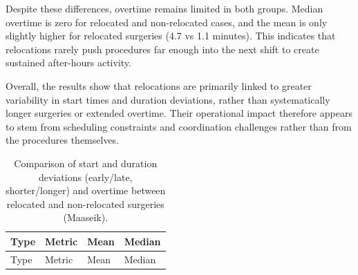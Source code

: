 \documentclass[
]{article}
\begin{document}
Despite these differences, overtime remains limited in both groups.
Median overtime is zero for relocated and non-relocated cases, and the
mean is only slightly higher for relocated surgeries (4.7 vs 1.1
minutes). This indicates that relocations rarely push procedures far
enough into the next shift to create sustained after-hours activity.

Overall, the results show that relocations are primarily linked to
greater variability in start times and duration deviations, rather than
systematically longer surgeries or extended overtime. Their operational
impact therefore appears to stem from scheduling constraints and
coordination challenges rather than from the procedures themselves.

\begin{longtable}[]{@{}
  >{\centering\arraybackslash}p{}
  >{\centering\arraybackslash}p{}
  >{\centering\arraybackslash}p{}
  >{\centering\arraybackslash}p{}@{}}
\caption{Comparison of start and duration deviations (early/late,
shorter/longer) and overtime between relocated and non-relocated
surgeries (Maaseik). \label{tab:room_swap_impact}}\tabularnewline
\toprule\noalign{}
\begin{minipage}[b]{\linewidth}\centering
Type
\end{minipage} & \begin{minipage}[b]{\linewidth}\centering
Metric
\end{minipage} & \begin{minipage}[b]{\linewidth}\centering
Mean
\end{minipage} & \begin{minipage}[b]{\linewidth}\centering
Median
\end{minipage} \\
\midrule\noalign{}
\endfirsthead
\toprule\noalign{}
\begin{minipage}[b]{\linewidth}\centering
Type
\end{minipage} & \begin{minipage}[b]{\linewidth}\centering
Metric
\end{minipage} & \begin{minipage}[b]{\linewidth}\centering
Mean
\end{minipage} & \begin{minipage}[b]{\linewidth}\centering
Median
\end{minipage} \\

\end{longtable}
\end{document}

